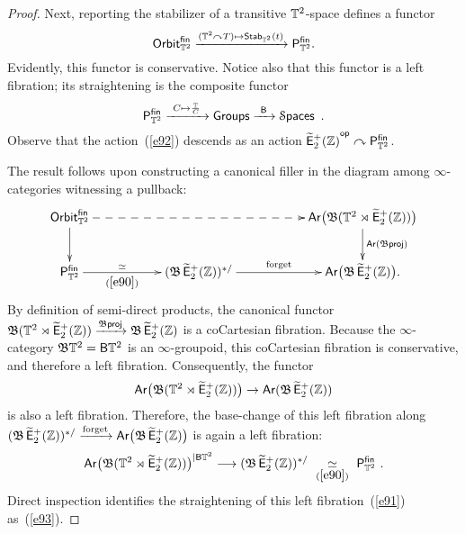 \begin{proof}
Next, reporting the stabilizer of a transitive $\mathbb T^2$-space defines a functor
\[
{\sf Orbit}^{\sf fin}_{\mathbb T^2} \xrightarrow{ (\mathbb T^2 \curvearrowright T)\mapsto {\sf Stab}_{\mathbb T^2}(t)} \mathsf P^{\sf fin}_{\mathbb T^2}.
\]
Evidently, this functor is conservative.
Notice also that this functor is a left fibration; its straightening is the composite functor
\begin{equation}
\label{e93}
\mathsf P^{\sf fin}_{\mathbb T^2}
\xrightarrow{~C\mapsto \frac{\mathbb T}{C}~}
{\sf Groups}
\xrightarrow{~\mathsf B~}
\operatorname{\mathcal S\mathsf{paces}}
~.
\end{equation}
Observe that the action~(\ref{e92}) descends as an action $\operatorname{\widetilde{\sf E}_{2}^{+}(\mathbb Z)}^{\operatorname{\mathsf{op}}}\curvearrowright \mathsf P^{\sf fin}_{\mathbb T^2}$.  



The result follows upon constructing a canonical filler in the diagram among $\infty$-categories witnessing a pullback:
\[
\xymatrix{
{\sf Orbit}_{\TT^2}^{\sf fin}
\ar@{-->}[rrrr]
\ar[d]
&&
&&
\Ar\bigl( \fB (\TT^2 \rtimes \Ebraid ) \bigr)
\ar[d]^-{\Ar(\fB {\sf proj}) }
\\
\sP^{\sf fin}_{\TT^2}
\ar[rr]^-{\simeq}_-{(\ref{e90})}
&&
(\fB \Ebraid)^{\ast/}
\ar[rr]^-{\rm forget}
&&
\Ar\bigl( \fB \Ebraid \bigr)
.
}
\]
By definition of semi-direct products,
the canonical functor $\mathfrak B (\mathbb T^2 \rtimes \operatorname{\widetilde{\sf E}_{2}^{+}(\mathbb Z)}) \xrightarrow{\mathfrak B \sf proj} \mathfrak B \operatorname{\widetilde{\sf E}_{2}^{+}(\mathbb Z)}$ is a coCartesian fibration.
Because the $\infty$-category $\mathfrak B \mathbb T^2 =\mathsf B \mathbb T^2$ is an $\infty$-groupoid, this coCartesian fibration is conservative, and therefore a left fibration.
Consequently, the functor 
\[
\operatorname{{\sf Ar}}\bigl( \mathfrak B (\mathbb T^2 \rtimes \operatorname{\widetilde{\sf E}_{2}^{+}(\mathbb Z)}) \bigr)
\to
\operatorname{{\sf Ar}}( \mathfrak B \operatorname{\widetilde{\sf E}_{2}^{+}(\mathbb Z)} )
\]
is also a left fibration.
Therefore, the base-change of this left fibration along $
(\mathfrak B \operatorname{\widetilde{\sf E}_{2}^{+}(\mathbb Z)})^{\ast/}
\xrightarrow{\rm forget}
\operatorname{{\sf Ar}}\bigl( \mathfrak B \operatorname{\widetilde{\sf E}_{2}^{+}(\mathbb Z)} \bigr)
$ is again a left fibration:
\begin{equation}
\label{e91}
\operatorname{{\sf Ar}}\bigl( \mathfrak B (\mathbb T^2 \rtimes \operatorname{\widetilde{\sf E}_{2}^{+}(\mathbb Z)}) \bigr)^{|\mathsf B \mathbb T^2}
\longrightarrow
(\mathfrak B \operatorname{\widetilde{\sf E}_{2}^{+}(\mathbb Z)})^{\ast/}
~\underset{(\ref{e90})}\simeq~
\mathsf P^{\sf fin}_{\mathbb T^2}
~.
\end{equation}
Direct inspection identifies the straightening of this left fibration~(\ref{e91}) as~(\ref{e93}).


\end{proof}


